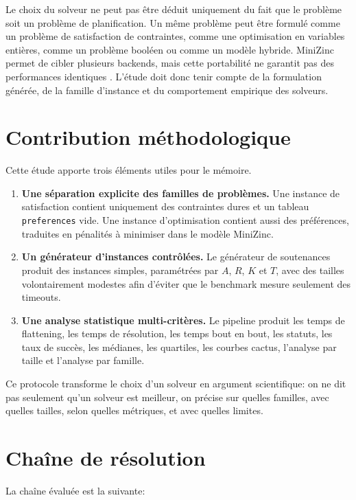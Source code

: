 \documentclass[12pt,a4paper]{article}
\newcommand{\mzn}{MiniZinc}
\begin{document}
Le choix du solveur ne peut pas être déduit uniquement du fait que le problème soit un problème de planification. Un même problème peut être formulé comme un problème de satisfaction de contraintes, comme une optimisation en variables entières, comme un problème booléen ou comme un modèle hybride. \mzn{} permet de cibler plusieurs backends, mais cette portabilité ne garantit pas des performances identiques \cite{minizinc-solvers}. L'étude doit donc tenir compte de la formulation générée, de la famille d'instance et du comportement empirique des solveurs.

\section{Contribution méthodologique}

Cette étude apporte trois éléments utiles pour le mémoire.

\begin{enumerate}
  \item \textbf{Une séparation explicite des familles de problèmes.} Une instance de satisfaction contient uniquement des contraintes dures et un tableau \texttt{preferences} vide. Une instance d'optimisation contient aussi des préférences, traduites en pénalités à minimiser dans le modèle \mzn{}.
  \item \textbf{Un générateur d'instances contrôlées.} Le générateur de soutenances produit des instances simples, paramétrées par $A$, $R$, $K$ et $T$, avec des tailles volontairement modestes afin d'éviter que le benchmark mesure seulement des timeouts.
  \item \textbf{Une analyse statistique multi-critères.} Le pipeline produit les temps de flattening, les temps de résolution, les temps bout en bout, les statuts, les taux de succès, les médianes, les quartiles, les courbes cactus, l'analyse par taille et l'analyse par famille.
\end{enumerate}

Ce protocole transforme le choix d'un solveur en argument scientifique: on ne dit pas seulement qu'un solveur est meilleur, on précise sur quelles familles, avec quelles tailles, selon quelles métriques, et avec quelles limites.

\section{Chaîne de résolution}

La chaîne évaluée est la suivante:
\end{document}
